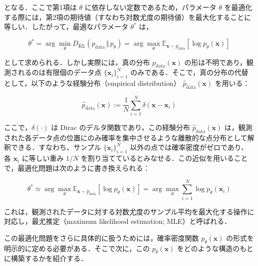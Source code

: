 \documentclass[titlepage]{ltjsbook}
\begin{document}
となる．ここで第1項は $\theta$ に依存しない定数であるため，パラメータ $\theta$ を最適化する際には，第2項の期待値（すなわち対数尤度の期待値）を最大化することに等しい．したがって，最適なパラメータ $\theta^*$ は，

\begin{equation}
\theta^* = \arg\min_\theta D_{\mathrm{KL}}\left(p_{\mathrm{data}} \,\Vert\, p_\theta\right)
= \arg\max_\theta \mathbb{E}_{\mathbf{x} \sim p_{\mathrm{data}}} \left[ \log p_\theta(\mathbf{x}) \right]
\end{equation}

として求められる．しかし実際には，真の分布 $p_{\mathrm{data}}(\mathbf{x})$ の形は不明であり，観測されるのは有限個のデータ点 $\{\mathbf{x}_i\}_{i=1}^N$ のみである．そこで，真の分布の代替として，以下のような経験分布（empirical distribution） $\hat{p}_{\mathrm{data}}(\mathbf{x})$ を用いる：

\begin{equation}
\hat{p}_{\mathrm{data}}(\mathbf{x}) := \frac{1}{N} \sum_{i=1}^N \delta(\mathbf{x} - \mathbf{x}_i)
\end{equation}

ここで，$\delta(\cdot)$ は Dirac のデルタ関数であり，この経験分布 $\hat{p}_{\mathrm{data}}(\mathbf{x})$ は，観測された各データ点の位置にのみ確率を集中させるような離散的な点分布として解釈できる．すなわち、サンプル $\{\mathbf{x}_i\}_{i=1}^N$ 以外の点では確率密度がゼロであり、各 $\mathbf{x}_i$ に等しい重み $1/N$ を割り当てているとみなせる．この近似を用いることで，最適化問題は次のように書き換えられる：

\begin{equation}
\theta^* \approx \arg\max_\theta \mathbb{E}_{\mathbf{x} \sim \hat{p}_{\mathrm{data}}} \left[ \log p_\theta(\mathbf{x}) \right]
= \arg\max_\theta \sum_{i=1}^N \log p_\theta(\mathbf{x}_i)
\end{equation}

これは，観測されたデータに対する対数尤度のサンプル平均を最大化する操作に対応し，最尤推定（maximum likelihood estimation; MLE）と呼ばれる．

この最適化問題をさらに具体的に扱うためには，確率密度関数 $p_\theta(\mathbf{x})$ の形式を明示的に定める必要がある．そこで次に，この $p_\theta(\mathbf{x})$ をどのような構造のもとに構築するかを紹介する．
\printbibliography[segment=\therefsegment,heading=subbibliography,title={参考文献}]
\end{document}
